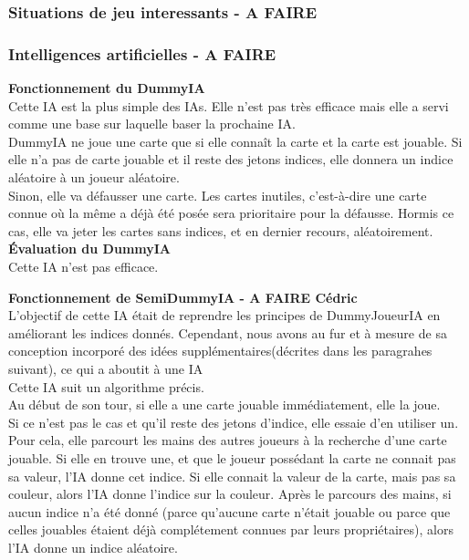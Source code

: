 \documentclass[11pt, letterpaper]{article}
\begin{document}
\subsubsection{Situations de jeu interessants - A FAIRE}

\subsubsection{Intelligences artificielles - A FAIRE}

\noindent \textbf{Fonctionnement du DummyIA}\\

\noindent Cette IA est la plus simple des IAs. Elle n'est pas très efficace mais elle a servi comme une base sur laquelle baser la prochaine IA.\\

\noindent DummyIA ne joue une carte que si elle connaît la carte et la carte est jouable. Si elle n'a pas de carte jouable et il reste des jetons indices, elle donnera un indice aléatoire à un joueur aléatoire. \\

\noindent Sinon, elle va défausser une carte. Les cartes inutiles, c'est-à-dire une carte connue où la même a déjà été posée sera prioritaire pour la défausse. Hormis ce cas, elle va jeter les cartes sans indices, et en dernier recours, aléatoirement.\\

\noindent \textbf{Évaluation du DummyIA}\\

\noindent Cette IA n'est pas efficace. 


\noindent \textbf{Fonctionnement de SemiDummyIA - A FAIRE Cédric}\\

\noindent
L'objectif de cette IA était de reprendre les principes de DummyJoueurIA en améliorant les indices donnés. Cependant, nous avons au fur et à mesure de sa conception incorporé des idées supplémentaires(décrites dans les paragrahes suivant), ce qui a aboutit à une IA\\

\noindent
Cette IA suit un algorithme précis.\\

\noindent Au début de son tour, si elle a une carte jouable immédiatement, elle la joue.\\

\noindent Si ce n'est pas le cas et qu'il reste des jetons d'indice, elle essaie d'en utiliser un. Pour cela, elle parcourt les mains des autres joueurs à la recherche d'une carte jouable. Si elle en trouve une, et que le joueur possédant la carte ne connait pas sa valeur, l'IA donne cet indice. Si elle connait la valeur de la carte, mais pas sa couleur, alors l'IA donne l'indice sur la couleur. Après le parcours des mains, si aucun indice n'a été donné (parce qu'aucune carte n'était jouable ou parce que celles jouables étaient déjà complétement connues par leurs propriétaires), alors l'IA donne un indice aléatoire.\\
\end{document}
